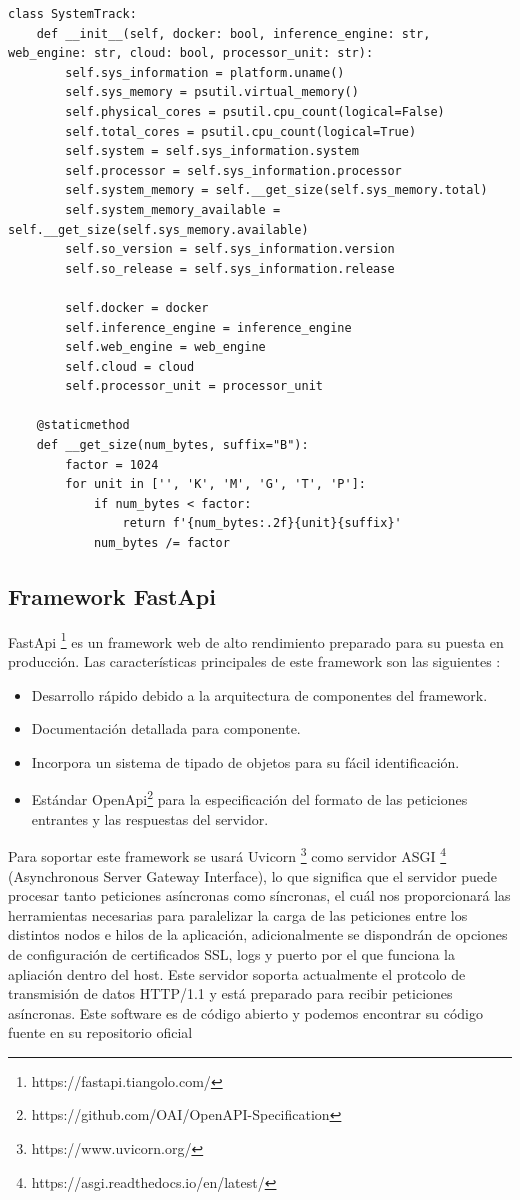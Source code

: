 \begin{lstlisting}[caption=Api, label=lst:system, float=t]
class SystemTrack:
    def __init__(self, docker: bool, inference_engine: str, web_engine: str, cloud: bool, processor_unit: str):
        self.sys_information = platform.uname()
        self.sys_memory = psutil.virtual_memory()
        self.physical_cores = psutil.cpu_count(logical=False)
        self.total_cores = psutil.cpu_count(logical=True)
        self.system = self.sys_information.system
        self.processor = self.sys_information.processor
        self.system_memory = self.__get_size(self.sys_memory.total)
        self.system_memory_available = self.__get_size(self.sys_memory.available)
        self.so_version = self.sys_information.version
        self.so_release = self.sys_information.release

        self.docker = docker
        self.inference_engine = inference_engine
        self.web_engine = web_engine
        self.cloud = cloud
        self.processor_unit = processor_unit

    @staticmethod
    def __get_size(num_bytes, suffix="B"):
        factor = 1024
        for unit in ['', 'K', 'M', 'G', 'T', 'P']:
            if num_bytes < factor:
                return f'{num_bytes:.2f}{unit}{suffix}'
            num_bytes /= factor
\end{lstlisting}
\subsection{Framework FastApi}\label{subsec:framework-fastapi}
FastApi \footnote{https://fastapi.tiangolo.com/} es un framework web de alto rendimiento preparado para su puesta en producción.
Las características principales de este framework son las siguientes :
\begin{itemize}
    \item Desarrollo rápido debido a la arquitectura de componentes del framework.
    \item Documentación detallada para componente.
    \item Incorpora un sistema de tipado de objetos para su fácil identificación.
    \item Estándar OpenApi\footnote{https://github.com/OAI/OpenAPI-Specification} para la especificación del formato de las peticiones entrantes y las respuestas del servidor.
\end{itemize}
Para soportar este framework se usará Uvicorn \footnote{https://www.uvicorn.org/} como servidor ASGI \footnote{https://asgi.readthedocs.io/en/latest/} (Asynchronous Server Gateway Interface), lo que significa que el servidor puede procesar tanto peticiones asíncronas como síncronas, el cuál nos proporcionará las herramientas necesarias para paralelizar la carga de las peticiones
entre los distintos nodos e hilos de la aplicación, adicionalmente se dispondrán de opciones de configuración de certificados SSL, logs y puerto por el que funciona la apliación dentro del host.
Este servidor soporta actualmente el protcolo de transmisión de datos HTTP/1.1 y está preparado para recibir peticiones asíncronas.
Este software es de código abierto y podemos encontrar su código fuente en su repositorio oficial

